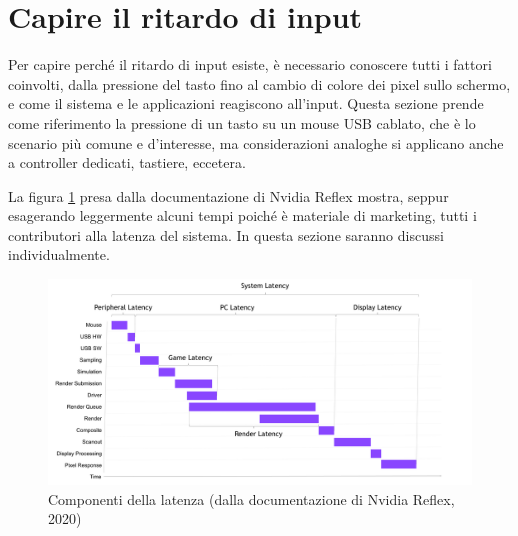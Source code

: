 \section{Capire il ritardo di input}
Per capire perché il ritardo di input esiste, è necessario conoscere tutti i fattori coinvolti, dalla pressione del tasto fino al cambio di colore dei pixel sullo schermo, e come il sistema e le applicazioni reagiscono all'input. Questa sezione prende come riferimento la pressione di un tasto su un mouse USB cablato, che è lo scenario più comune e d'interesse, ma considerazioni analoghe si applicano anche a controller dedicati, tastiere, eccetera.

La figura \ref{fig:nvidia_latencypipeline} presa dalla documentazione di Nvidia Reflex mostra, seppur esagerando leggermente alcuni tempi poiché è materiale di marketing, tutti i contributori alla latenza del sistema. In questa sezione saranno discussi individualmente.

\begin{figure}[h]
	\centering
	\includegraphics[width=\textwidth]{Chapter01/res/nvidia_latencypipeline.png}
	\caption{Componenti della latenza (dalla documentazione di Nvidia Reflex, 2020)}
	\label{fig:nvidia_latencypipeline}
\end{figure}

